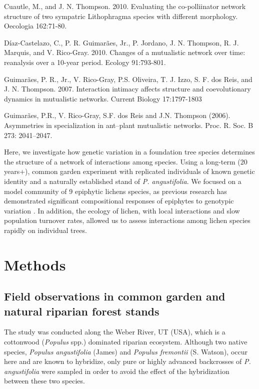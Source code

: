 \documentclass[fleqn,10pt]{wlscirep}
\begin{document}
Cuautle, M., and J. N. Thompson. 2010. Evaluating the co-polliinator
network structure of two sympatric Lithophragma species with different
morphology. Oecologia 162:71-80.

Díaz-Castelazo, C., P. R. Guimarães, Jr., P. Jordano, J. N. Thompson,
R. J. Marquis, and V. Rico-Gray. 2010. Changes of a mutualistic
network over time: reanalysis over a 10-year period. Ecology
91:793-801.


Guimarães, P. R., Jr., V. Rico-Gray, P.S. Oliveira, T. J. Izzo,
S. F. dos Reis, and J. N. Thompson. 2007. Interaction intimacy affects
structure and coevolutionary dynamics in mutualistic networks. Current
Biology 17:1797-1803

Guimarães, P.R., V. Rico-Gray, S.F. dos Reis and J.N. Thompson
(2006). Asymmetries in specialization in ant–plant mutualistic
networks. Proc. R. Soc. B 273: 2041–2047.



Here, we investigate how genetic variation in a foundation tree
species determines the structure of a network of interactions among
species. Using a long-term (20 years+), common garden experiment with
replicated individuals of known genetic identity and a naturally
established stand of \textit{P. angustifolia}. We focused on a model
community of 9 epiphytic lichens species, as previous research has
demonstrated significant compositional responses of epiphytes to
genotypic variation \cite{Winfree2011, Zytynska2011}. In addition, the
ecology of lichen, with local interactions and slow population
turnover rates, allowed us to assess interactions among lichen species
rapidly on individual trees.


\section*{Methods}


\subsection*{Field observations in common garden and natural riparian
  forest stands}

The study was conducted along the Weber River, UT (USA), which is a
cottonwood (\textit{Populus} spp.) dominated riparian
ecosystem. Although two native species, \textit{Populus angustifolia}
(James) and \textit{Populus fremontii} (S. Watson), occur here and are
known to hybridize, only pure or highly advanced backcrosses of
\textit{P. angustifolia} were sampled in order to avoid the effect of
the hybridization between these two species.
\end{document}
